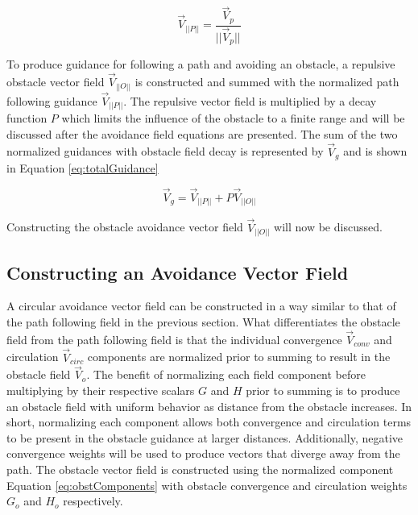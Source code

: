 \documentclass[numbered,pdftex]{ohio-etd}
\begin{document}
\begin{equation}
\overrightarrow{V}_{||P||} = \frac{\overrightarrow{V}_p}{||\overrightarrow{V}_p||}
\label{gonAllCompNormalized}
\end{equation}

To produce guidance for following a path and avoiding an obstacle, a repulsive obstacle vector field $\overrightarrow{V}_{||O||}$ is constructed and summed with the normalized path following guidance $\overrightarrow{V}_{||P||}$. The repulsive vector field is multiplied by a decay function $P$ which limits the influence of the obstacle to a finite range and will be discussed after the avoidance field equations are presented. The sum of the two normalized guidances with obstacle field decay is represented by $\overrightarrow{V}_g$ and is shown in Equation \ref{eq:totalGuidance}


\begin{equation}
\label{eq:totalGuidance}
\overrightarrow{V}_g = \overrightarrow{V}_{||P||} + P\overrightarrow{V}_{||O||}
\end{equation}

\noindent
Constructing the obstacle avoidance vector field $\overrightarrow{V}_{||O||}$ will now be discussed.

\subsection{Constructing an Avoidance Vector Field}

A circular avoidance vector field can be constructed in a way similar to that of the path following field in the previous section. What differentiates the obstacle field from the path following field is that the individual convergence $\overrightarrow{V}_{conv}$ and circulation $\overrightarrow{V}_{circ}$ components are normalized prior to summing to result in the obstacle field $\overrightarrow{V}_o$. The benefit of normalizing each field component before multiplying by their respective scalars $G$ and $H$ prior to summing is to produce an obstacle field with uniform behavior as distance from the obstacle increases. In short, normalizing each component allows both convergence and circulation terms to be present in the obstacle guidance at larger distances. Additionally, negative convergence weights will be used to produce vectors that diverge away from the path. The obstacle vector field is constructed using the normalized component Equation \ref{eq:obstComponents} with obstacle convergence and circulation weights $G_o$ and $H_o$ respectively.
\end{document}
